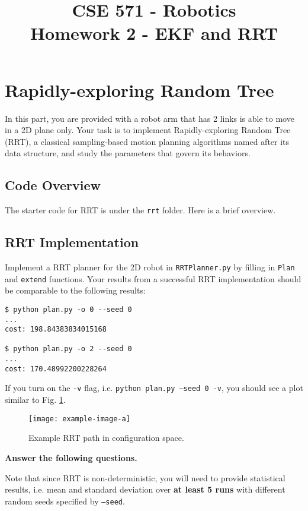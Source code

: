 \documentclass[tp]{lcc}
\title{CSE 571 - Robotics \\ Homework 2 - EKF and RRT}
\author{}
\date{}
\begin{document}
\maketitle

\section{Rapidly-exploring Random Tree}
In this part, you are provided with a robot arm that has 2 links is able to move in a 2D plane only. Your task is to implement Rapidly-exploring Random Tree (RRT), a classical sampling-based motion planning algorithms named after its data structure, and study the parameters that govern its behaviors.

\subsection{Code Overview}
The starter code for RRT is under the \texttt{rrt} folder. Here is a brief overview.

\subsection{RRT Implementation}
Implement a RRT planner for the 2D robot in \texttt{RRTPlanner.py} by filling in \texttt{Plan} and \texttt{extend} functions. Your results from a successful RRT implementation should be comparable to the following results:

\begin{verbatim}
$ python plan.py -o 0 --seed 0
...
cost: 198.84383834015168

$ python plan.py -o 2 --seed 0
...
cost: 170.48992200228264
\end{verbatim}

If you turn on the \texttt{-v} flag, i.e. \texttt{python plan.py --seed 0 -v}, you should see a plot similar to Fig. \ref{fig:rrt}.

 \begin{figure}[h]
     \centering
     \texttt{[image: example-image-a]}
     \caption{Example RRT path in configuration space.}
     \label{fig:rrt}
 \end{figure}

\textbf{Answer the following questions.}

Note that since RRT is non-deterministic, you will need to provide statistical results, i.e. mean and standard deviation over \textbf{at least 5 runs} with different random seeds specified by \texttt{--seed}.
\end{document}
